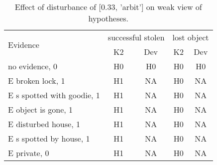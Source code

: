 \begin{table}\begin{tabular}{l|cc|cc}\toprule\multirow{2}{*}{Evidence} & \multicolumn{2}{c}{successful stolen}& \multicolumn{2}{c}{lost object}\\& {K2} & {Dev}& {K2} & {Dev}\\\midrule
no evidence, 0 & H0&H0&H0&H0\\E broken lock, 1 & \cellcolor{Bittersweet}H1&\cellcolor{Bittersweet}NA&\cellcolor{Bittersweet}H0&\cellcolor{Bittersweet}NA\\E s spotted with goodie, 1 & \cellcolor{Bittersweet}H1&\cellcolor{Bittersweet}NA&\cellcolor{Bittersweet}H0&\cellcolor{Bittersweet}NA\\E object is gone, 1 & \cellcolor{Bittersweet}H1&\cellcolor{Bittersweet}NA&\cellcolor{Bittersweet}H0&\cellcolor{Bittersweet}NA\\E disturbed house, 1 & \cellcolor{Bittersweet}H1&\cellcolor{Bittersweet}NA&\cellcolor{Bittersweet}H0&\cellcolor{Bittersweet}NA\\E s spotted by house, 1 & \cellcolor{Bittersweet}H1&\cellcolor{Bittersweet}NA&\cellcolor{Bittersweet}H0&\cellcolor{Bittersweet}NA\\E private, 0 & \cellcolor{Bittersweet}H1&\cellcolor{Bittersweet}NA&\cellcolor{Bittersweet}H0&\cellcolor{Bittersweet}NA\\\bottomrule\end{tabular}\caption{Effect of disturbance of [0.33, 'arbit'] on weak view of hypotheses.}\end{table}